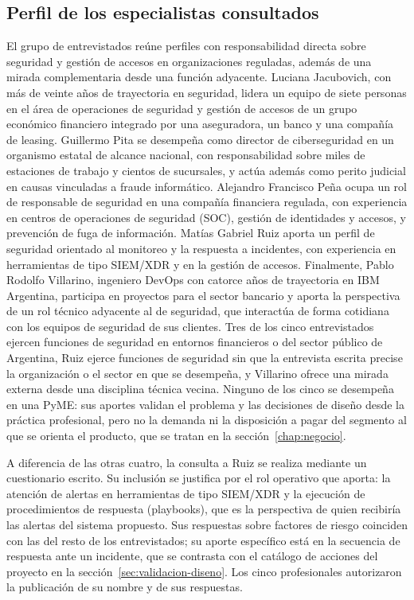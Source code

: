\subsection{Perfil de los especialistas consultados}
El grupo de entrevistados reúne perfiles con responsabilidad directa sobre seguridad y gestión de accesos en organizaciones reguladas, además de una mirada complementaria desde una función adyacente. Luciana Jacubovich, con más de veinte años de trayectoria en seguridad, lidera un equipo de siete personas en el área de operaciones de seguridad y gestión de accesos de un grupo económico financiero integrado por una aseguradora, un banco y una compañía de leasing. Guillermo Pita se desempeña como director de ciberseguridad en un organismo estatal de alcance nacional, con responsabilidad sobre miles de estaciones de trabajo y cientos de sucursales, y actúa además como perito judicial en causas vinculadas a fraude informático. Alejandro Francisco Peña ocupa un rol de responsable de seguridad en una compañía financiera regulada, con experiencia en centros de operaciones de seguridad (SOC), gestión de identidades y accesos, y prevención de fuga de información. Matías Gabriel Ruiz aporta un perfil de seguridad orientado al monitoreo y la respuesta a incidentes, con experiencia en herramientas de tipo SIEM/XDR y en la gestión de accesos. Finalmente, Pablo Rodolfo Villarino, ingeniero DevOps con catorce años de trayectoria en IBM Argentina, participa en proyectos para el sector bancario y aporta la perspectiva de un rol técnico adyacente al de seguridad, que interactúa de forma cotidiana con los equipos de seguridad de sus clientes. Tres de los cinco entrevistados ejercen funciones de seguridad en entornos financieros o del sector público de Argentina, Ruiz ejerce funciones de seguridad sin que la entrevista escrita precise la organización o el sector en que se desempeña, y Villarino ofrece una mirada externa desde una disciplina técnica vecina. Ninguno de los cinco se desempeña en una PyME: sus aportes validan el problema y las decisiones de diseño desde la práctica profesional, pero no la demanda ni la disposición a pagar del segmento al que se orienta el producto, que se tratan en la sección~\ref{chap:negocio}.

A diferencia de las otras cuatro, la consulta a Ruiz se realiza mediante un cuestionario escrito. Su
inclusión se justifica por el rol operativo que aporta: la atención de alertas en herramientas de
tipo SIEM/XDR y la ejecución de procedimientos de respuesta (playbooks), que es la perspectiva de
quien recibiría las alertas del sistema propuesto. Sus respuestas sobre factores de riesgo coinciden
con las del resto de los entrevistados; su aporte específico está en la secuencia de respuesta ante
un incidente, que se contrasta con el catálogo de acciones del proyecto en la sección~\ref{sec:validacion-diseno}. Los cinco profesionales autorizaron la publicación de su nombre y de sus respuestas.

